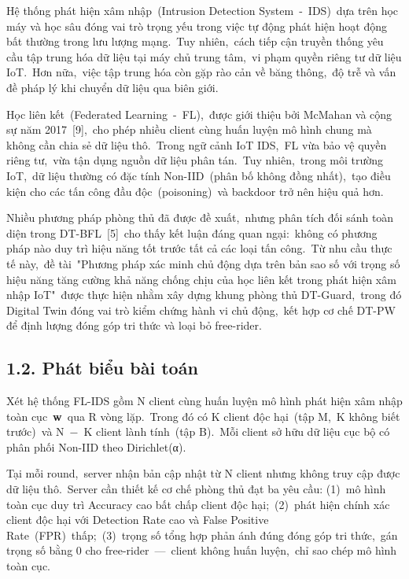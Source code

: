 Hệ thống phát hiện xâm nhập~(Intrusion Detection System~-~IDS)~dựa trên học máy và học sâu đóng vai trò trọng yếu trong việc tự động phát hiện hoạt động bất thường trong lưu lượng mạng.~Tuy nhiên,~cách tiếp cận truyền thống yêu cầu tập trung hóa dữ liệu tại máy chủ trung tâm,~vi phạm quyền riêng tư dữ liệu IoT.~Hơn nữa,~việc tập trung hóa còn gặp rào cản về băng thông,~độ trễ và vấn đề pháp lý khi chuyển dữ liệu qua biên giới.

Học liên kết~(Federated Learning~-~FL),~được giới thiệu bởi McMahan và cộng sự năm 2017~{[}9{]},~cho phép nhiều client cùng huấn luyện mô hình chung mà không cần chia sẻ dữ liệu thô.~Trong ngữ cảnh IoT IDS,~FL vừa bảo vệ quyền riêng tư,~vừa tận dụng nguồn dữ liệu phân tán.~Tuy nhiên,~trong môi trường IoT,~dữ liệu thường có đặc tính Non-IID~(phân bố không đồng nhất),~tạo điều kiện cho các tấn công đầu độc~(poisoning)~và backdoor trở nên hiệu quả hơn.

Nhiều phương pháp phòng thủ đã được đề xuất,~nhưng phân tích đối sánh toàn diện trong DT-BFL~{[}5{]}~cho thấy kết luận đáng quan ngại:~không có phương pháp nào duy trì hiệu năng tốt trước tất cả các loại tấn công.~Từ nhu cầu thực tế này,~đề tài~"Phương pháp xác minh chủ động dựa trên bản sao số với trọng số hiệu năng tăng cường khả năng chống chịu của học liên kết trong phát hiện xâm nhập IoT"~được thực hiện nhằm xây dựng khung phòng thủ DT-Guard,~trong đó Digital Twin đóng vai trò kiểm chứng hành vi chủ động,~kết hợp cơ chế DT-PW để định lượng đóng góp tri thức và loại bỏ free-rider.

\subsection{1.2. Phát biểu bài toán}\label{phuxe1t-biux1ec3u-buxe0i-touxe1n}

Xét hệ thống FL-IDS gồm N client cùng huấn luyện mô hình phát hiện xâm nhập toàn cục~\textbf{w}~qua R vòng lặp.~Trong đó có K client độc hại~(tập M,~K không biết trước)~và N~−~K client lành tính~(tập B).~Mỗi client sở hữu dữ liệu cục bộ có phân phối Non-IID theo Dirichlet(α).

Tại mỗi round,~server nhận bản cập nhật từ N client nhưng không truy cập được dữ liệu thô.~Server cần thiết kế cơ chế phòng thủ đạt ba yêu cầu: (1)~mô hình toàn cục duy trì Accuracy cao bất chấp client độc hại;~(2)~phát hiện chính xác client độc hại với Detection Rate cao và False Positive Rate~(FPR)~thấp;~(3)~trọng số tổng hợp phản ánh đúng đóng góp tri thức,~gán trọng số bằng 0 cho free-rider~---~client không huấn luyện,~chỉ sao chép mô hình toàn cục.

